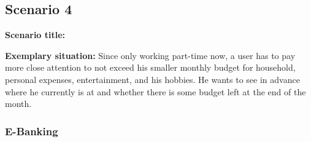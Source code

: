 
\subsection{Scenario 4}

\textbf{Scenario title:} \scenfour

\textbf{Exemplary situation:} Since only working part-time now, a user has to pay more close attention to not exceed his smaller monthly budget for household, personal expenses, entertainment, and his hobbies. He wants to see in advance where he currently is at and whether there is some budget left at the end of the month.



\subsubsection{E-Banking}

